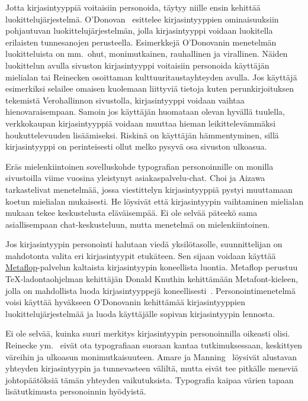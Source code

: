 \documentclass[finnish, 12pt, a4paper, elec, utf8, a-1b, online]{aaltothesis}
\begin{document}
Jotta kirjasintyyppiä voitaisiin personoida, täytyy niille ensin kehittää
luokittelujärjestelmä. O'Donovan~\cite{odonovan_2015} esittelee kirjasintyyppien
ominaisuuksiin pohjautuvan luokittelujärjestelmän, jolla kirjasintyyppi voidaan
luokitella erilaisten tunnesanojen perusteella. Esimerkkejä O'Donovanin
menetelmän luokitteluista on mm.~ohut, monimutkainen, rauhallinen ja virallinen.
Näiden luokittelun avulla sivuston kirjasintyyppi voitaisiin personoida
käyttäjän mielialan tai Reinecken osoittaman kulttuuritaustayhteyden avulla. Jos
käyttäjä esimerkiksi selailee omaisen kuolemaan liittyviä tietoja kuten
perunkirjoituksen tekemistä Verohallinnon sivustolla, kirjasintyyppi voidaan
vaihtaa hienovaraisempaan. Samoin jos käyttäjän huomataan olevan hyvällä
tuulella, verkkokaupan kirjasintyyppiä voidaan muuttaa hieman leikittelevämmäksi
houkuttelevuuden lisäämiseksi. Riskinä on käyttäjän hämmentyminen, sillä
kirjasintyyppi on perinteisesti ollut melko pysyvä osa sivuston ulkoasua.

Eräs mielenkiintoinen sovelluskohde typografian personoinnille on monilla
sivustoilla viime vuosina yleistynyt asiakaspalvelu-chat. Choi ja
Aizawa~\cite{choi_aizawa_2018} tarkastelivat menetelmää, jossa viestittelyn
kirjasintyyppiä pystyi muuttamaan koetun mielialan mukaisesti. He löysivät että
kirjasintyypin vaihtaminen mielialan mukaan tekee keskustelusta eläväisempää. Ei
ole selvää päteekö sama asiallisempaan chat-keskusteluun, mutta menetelmä on
mielenkiintoinen.

Jos kirjasintyypin personointi halutaan viedä yksilötasolle, suunnittelijan on
mahdotonta valita eri kirjasintyypit etukäteen. Sen sijaan voidaan käyttää
\href{https://www.metaflop.com/}{Metaflop}-palvelun kaltaista kirjasintyypin
koneellista luontia. Metaflop perustuu TeX-ladontaohjelman kehittäjän Donald
Knuthin kehittämään Metafont-kieleen, jolla on mahdollista luoda
kirjasintyyppejä koneellisesti~\cite{knuth_1986}. Personointimenetelmä voisi
käyttää hyväkseen O'Donovanin kehittämää kirjasintyyppien luokittelujärjestelmää
ja luoda käyttäjälle sopivan kirjasintyypin lennosta.

Ei ole selvää, kuinka suuri merkitys kirjasintyypin personoinnilla oikeasti
olisi. Reinecke ym.~\cite{10.1145/2556288.2557052} eivät ota typografiaan
suoraan kantaa tutkimuksessaan, keskittyen väreihin ja ulkoasun
monimutkaisuuteen. Amare ja Manning~\cite{10.1109/IPCC.2012.6408605} löysivät
alustavan yhteyden kirjasintyypin ja tunnevasteen väliltä, mutta eivät tee
pitkälle meneviä johtopäätöksiä tämän yhteyden vaikutuksista. Typografia kaipaa
värien tapaan lisätutkimusta personoinnin hyödyistä.
\end{document}
